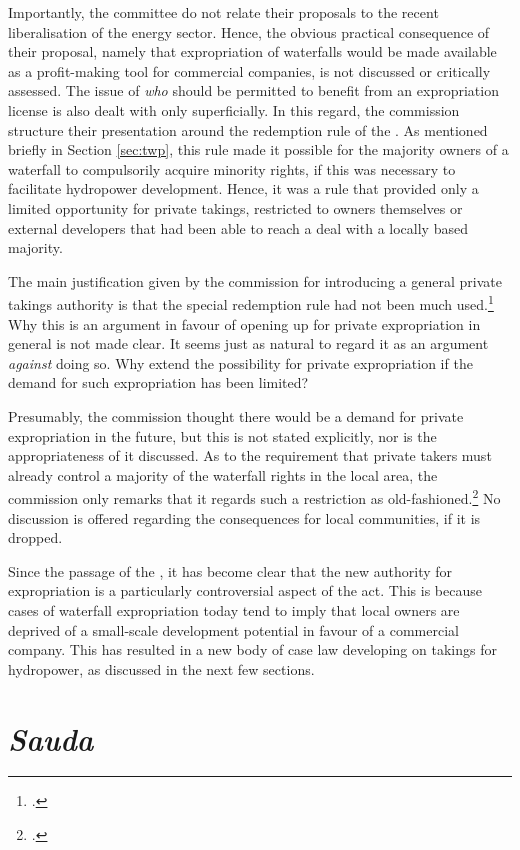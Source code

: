 Importantly, the committee do not relate their proposals to the recent liberalisation of the energy sector. Hence, the obvious practical consequence of their proposal, namely that expropriation of waterfalls would be made available as a profit-making tool for commercial companies, is not discussed or critically assessed. The issue of {\it who} should be permitted to benefit from an expropriation license is also dealt with only superficially. In this regard, the commission structure their presentation around the redemption rule of the \cite{wra40}. As mentioned briefly in Section \ref{sec:twp}, this rule made it possible for the majority owners of a waterfall to compulsorily acquire minority rights, if this was necessary to facilitate hydropower development. Hence, it was a rule that provided only a limited opportunity for private takings, restricted to owners themselves or external developers that had been able to reach a deal with a locally based majority.

The main justification given by the commission for introducing a general private takings authority is that the special redemption rule had not been much used.\footcite[236]{nou94} Why this is an argument in favour of opening up for private expropriation in general is not made clear. It seems just as natural to regard it as an argument {\it against} doing so. Why extend the possibility for private expropriation if the demand for such expropriation has been limited?

Presumably, the commission thought there would be a demand for private expropriation in the future, but this is not stated explicitly, nor is the appropriateness of it discussed. As to the requirement that private takers must already control a majority of the waterfall rights in the local area, the commission only remarks that it regards such a restriction as old-fashioned.\footcite[236]{nou94} No discussion is offered regarding the consequences for local communities, if it is dropped.

Since the passage of the \cite{wra00}, it has become clear that the new authority for expropriation is a particularly controversial aspect of the act. This is because cases of waterfall expropriation today tend to imply that local owners are deprived of a small-scale development potential in favour of a commercial company. This has resulted in a new body of case law developing on takings for hydropower, as discussed in the next few sections.

\section{{\it Sauda}}\label{sec:sauda}

